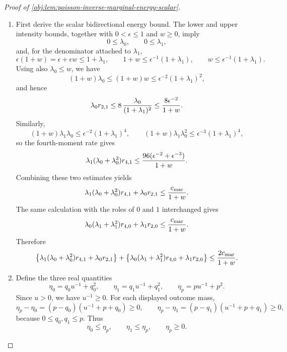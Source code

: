 \documentclass[11pt]{article}
\begin{document}
\begin{proof}[Proof of \cref{obj:lem:poisson-inverse-marginal-energy-scalar}]
\begin{enumerate}
\item First derive the scalar bidirectional energy bound.  The lower and upper intensity bounds, together with \(0<\epsilon\le1\) and \(w\ge0\), imply
\[
0\le \lambda_0,\qquad 0\le \lambda_1,
\]
and, for the denominator attached to \(\lambda_1\),
\[
\epsilon(1+w)=\epsilon+\epsilon w\le 1+\lambda_1,
\qquad
1+w\le \epsilon^{-1}(1+\lambda_1),
\qquad
w\le \epsilon^{-1}(1+\lambda_1).
\]
Using also \(\lambda_0\le w\), we have
\[
(1+w)\lambda_0
   \le (1+w)w
   \le \epsilon^{-2}(1+\lambda_1)^2,
\]
and hence
\[
\lambda_0 r_{2,1}
   \le 8\,{\lambda_0\over (1+\lambda_1)^2}
   \le {8\epsilon^{-2}\over 1+w}.
\]
Similarly,
\[
(1+w)\lambda_1\lambda_0
 \le \epsilon^{-2}(1+\lambda_1)^4,
\qquad
(1+w)\lambda_1\lambda_0^2
 \le \epsilon^{-3}(1+\lambda_1)^4,
\]
so the fourth-moment rate gives
\[
\lambda_1(\lambda_0+\lambda_0^2)r_{4,1}
 \le
 {96(\epsilon^{-2}+\epsilon^{-3})\over 1+w}.
\]
Combining these two estimates yields
\[
\lambda_1(\lambda_0+\lambda_0^2)r_{4,1}
 +\lambda_0 r_{2,1}
 \le {c_{\mathrm{mar}}\over 1+w}.
\]
The same calculation with the roles of \(0\) and \(1\) interchanged gives
\[
\lambda_0(\lambda_1+\lambda_1^2)r_{4,0}
 +\lambda_1 r_{2,0}
 \le {c_{\mathrm{mar}}\over 1+w}.
\]
Therefore
\[
\bigl\{\lambda_1(\lambda_0+\lambda_0^2)r_{4,1}
 +\lambda_0 r_{2,1}\bigr\}
+
\bigl\{\lambda_0(\lambda_1+\lambda_1^2)r_{4,0}
 +\lambda_1 r_{2,0}\bigr\}
\le {2c_{\mathrm{mar}}\over 1+w}.
\]

\item Define the three real quantities
\[
\eta_0=q_0u^{-1}+q_0^2,\qquad
\eta_1=q_1u^{-1}+q_1^2,\qquad
\eta_p=pu^{-1}+p^2 .
\]
Since \(u>0\), we have \(u^{-1}\ge0\).  For each displayed outcome mass,
\[
\eta_p-\eta_0
  =(p-q_0)(u^{-1}+p+q_0)\ge0,
\qquad
\eta_p-\eta_1
  =(p-q_1)(u^{-1}+p+q_1)\ge0,
\]
because \(0\le q_0,q_1\le p\).  Thus
\[
\eta_0\le \eta_p,\qquad \eta_1\le \eta_p,
\qquad \eta_p\ge0.
\]


\end{enumerate}
\end{proof}
\end{document}
